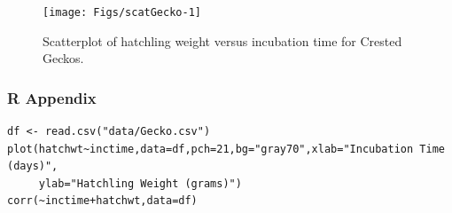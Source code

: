 \documentclass[10pt,openany]{book}\usepackage[]{graphicx}\usepackage[]{color}
\makeatletter
\newenvironment{kframe}{%
 \def\at@end@of@kframe{}%
 \ifinner\ifhmode%
  \def\at@end@of@kframe{\end{minipage}}%
  \begin{minipage}{\columnwidth}%
 \fi\fi%
 \def\FrameCommand##1{\hskip\@totalleftmargin \hskip-\fboxsep
 \colorbox{shadecolor}{##1}\hskip-\fboxsep
     \hskip-\linewidth \hskip-\@totalleftmargin \hskip\columnwidth}%
 \MakeFramed {\advance\hsize-\width
   \@totalleftmargin\z@ \linewidth\hsize
   \@setminipage}}%
 {\par\unskip\endMakeFramed%
 \at@end@of@kframe}
\newenvironment{knitrout}{}{} %
\makeatother
\begin{document}
\begin{knitrout}
\color{fgcolor}\begin{figure}[hbtp]

{\centering \texttt{[image: Figs/scatGecko-1]} 

}

\caption[Scatterplot of hatchling weight versus incubation time for Crested Geckos]{Scatterplot of hatchling weight versus incubation time for Crested Geckos.}\label{fig:scatGecko}
\end{figure}


\end{knitrout}

\vspace{-18pt}
\subsubsection*{R Appendix}
\vspace{-6pt}
\begin{knitrout}
\color{fgcolor}\begin{kframe}
\begin{verbatim}
df <- read.csv("data/Gecko.csv")
plot(hatchwt~inctime,data=df,pch=21,bg="gray70",xlab="Incubation Time (days)",
     ylab="Hatchling Weight (grams)")
corr(~inctime+hatchwt,data=df)
\end{verbatim}
\end{kframe}
\end{knitrout}
\end{document}
